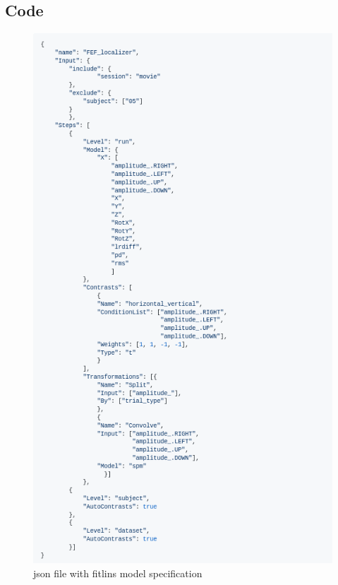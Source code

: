 \documentclass[a4paper, 12pt]{scrreprt}
\begin{document}
\begin{appendices}
\chapter{Code}\label{A:code}

\begin{figure} [H]
	\includegraphics[scale = 0.7]{img/json_fitlins.png}\hfill
	\caption{json file with fitlins model specification}
	\label{A:fitlins}
\end{figure}




\end{appendices}
\end{document}
